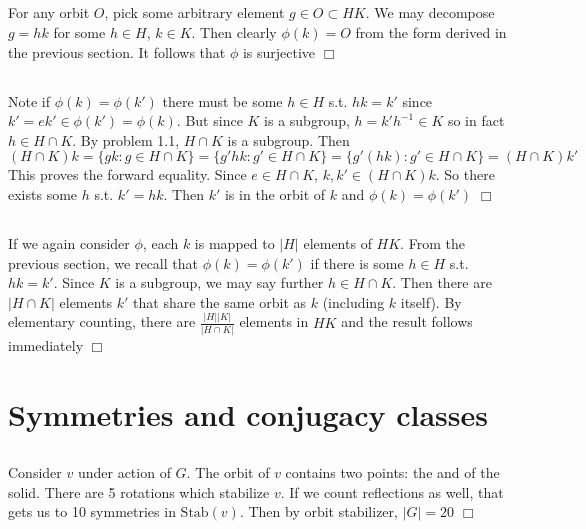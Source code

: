 \documentclass{article}
\begin{document}
\subsection{}
For any orbit $O$, pick some arbitrary element $g \in O \subset HK$. We may decompose $g = hk$ for some $h \in H$, $k \in K$. Then clearly $\phi(k) = O$ from the form derived in the previous section. It follows that $\phi$ is surjective $\Box$

\subsection{}
Note if $\phi(k) = \phi(k')$ there must be some $h \in H$ s.t. $hk = k'$ since $k' = ek' \in \phi(k') = \phi(k)$. But since $K$ is a subgroup, $h = k'h^{-1} \in K$ so in fact $h \in H \cap K$. By problem 1.1, $H \cap K$ is a subgroup. Then 
$$(H \cap K)k = \{gk : g \in H \cap K\} = \{g'hk : g' \in H \cap K\} = \{g'(hk) : g' \in H \cap K\} = (H \cap K)k'$$
This proves the forward equality. Since $e \in H \cap K$, $k,k' \in (H \cap K)k$. So there exists some $h$ s.t. $k' = hk$. Then $k'$ is in the orbit of $k$ and $\phi(k) = \phi(k')$ $\Box$

\subsection{}
If we again consider $\phi$, each $k$ is mapped to $|H|$ elements of $HK$. From the previous section, we recall that $\phi(k) = \phi(k')$ if there is some $h \in H$ s.t. $hk = k'$. Since $K$ is a subgroup, we may say further $h \in H \cap K$. Then there are $|H \cap K|$ elements $k'$ that share the same orbit as $k$ (including $k$ itself). By elementary counting, there are $\frac{|H||K|}{|H \cap K|}$ elements in $HK$ and the result follows immediately $\Box$

\section{Symmetries and conjugacy classes}
\subsection{}
Consider $v$ under action of $G$. The orbit of $v$ contains two points: the  and  of the solid. There are 5 rotations which stabilize $v$. If we count reflections as well, that gets us to 10 symmetries in $\mathrm{Stab}(v)$. Then by orbit stabilizer, $|G| = 20$ $\Box$
\end{document}
